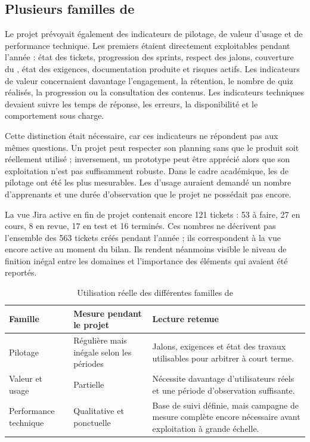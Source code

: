 \subsection{Plusieurs familles de }

Le projet prévoyait également des indicateurs de pilotage, de valeur d'usage et de performance technique. Les premiers étaient directement exploitables pendant l'année : état des tickets, progression des sprints, respect des jalons, couverture du , état des exigences, documentation produite et risques actifs. Les indicateurs de valeur concernaient davantage l'engagement, la rétention, le nombre de quiz réalisés, la progression ou la consultation des contenus. Les indicateurs techniques devaient suivre les temps de réponse, les erreurs, la disponibilité et le comportement sous charge.

Cette distinction était nécessaire, car ces indicateurs ne répondent pas aux mêmes questions. Un projet peut respecter son planning sans que le produit soit réellement utilisé ; inversement, un prototype peut être apprécié alors que son exploitation n'est pas suffisamment robuste. Dans le cadre académique, les  de pilotage ont été les plus mesurables. Les  d'usage auraient demandé un nombre d'apprenants et une durée d'observation que le projet ne possédait pas encore.

La vue Jira active en fin de projet contenait encore 121 tickets : 53 à faire, 27 en cours, 8 en revue, 17 en test et 16 terminés. Ces nombres ne décrivent pas l'ensemble des 563 tickets créés pendant l'année ; ils correspondent à la vue encore active au moment du bilan. Ils rendent néanmoins visible le niveau de finition inégal entre les domaines et l'importance des éléments qui avaient été reportés.

\begin{table}[H]
\centering
\begin{tabular}{p{4.2cm} p{3cm} p{6.5cm}}
\toprule
\textbf{Famille} & \textbf{Mesure pendant le projet} & \textbf{Lecture retenue} \\
\midrule
Pilotage & Régulière mais inégale selon les périodes & Jalons, exigences et état des travaux utilisables pour arbitrer à court terme. \\
Valeur et usage & Partielle & Nécessite davantage d'utilisateurs réels et une période d'observation suffisante. \\
Performance technique & Qualitative et ponctuelle & Base de suivi définie, mais campagne de mesure complète encore nécessaire avant exploitation à grande échelle. \\
\bottomrule
\end{tabular}
\caption{Utilisation réelle des différentes familles de }
\label{tab:lynx-kpi}
\end{table}

